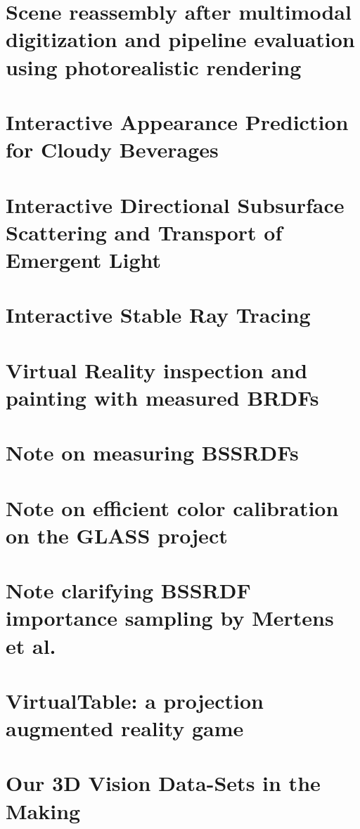 \chapter{Scene reassembly after multimodal digitization and pipeline evaluation using photorealistic rendering}


\chapter{Interactive Appearance Prediction for Cloudy Beverages}


\chapter{Interactive Directional Subsurface Scattering and Transport of Emergent Light}


\chapter{Interactive Stable Ray Tracing}


\chapter{Virtual Reality inspection and painting with measured BRDFs}


\chapter{Note on measuring BSSRDFs}


\chapter{Note on efficient color calibration on the GLASS project}


\chapter{Note clarifying BSSRDF importance sampling by Mertens et al.}


\chapter{VirtualTable: a projection augmented reality game}


\chapter{Our 3D Vision Data-Sets in the Making}


